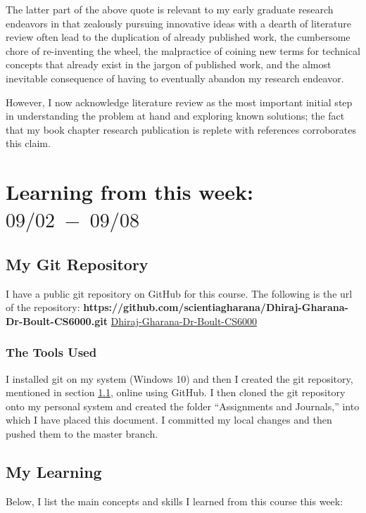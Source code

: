 \documentclass[journal]{IEEEtran}
\begin{document}
\noindent The latter part of the above quote is relevant to my early graduate research endeavors in that zealously pursuing innovative ideas with a dearth of literature review often lead to the duplication of already published work, the cumbersome chore of re-inventing the wheel, the malpractice of coining new terms for technical concepts that already exist in the jargon of published work, and the almost inevitable consequence of having to eventually abandon my research endeavor.  

\noindent However, I now acknowledge literature review as the most important initial step in understanding the problem at hand and exploring known solutions; the fact that my book chapter research publication is replete with references corroborates this claim.  

\section{Learning from this week: {\normalsize $09/02 \; - \; 09/08$ }}
\label{sec:learning}  

\subsection{My Git Repository}  
\label{sec:gitrepo}  
  
\noindent I have a public git repository on GitHub for this course. The following is the url of the repository: {\footnotesize  \textbf{https://github.com/scientiagharana/Dhiraj-Gharana-Dr-Boult-CS6000.git}} \href{https://github.com/scientiagharana/Dhiraj-Gharana-Dr-Boult-CS6000.git}{Dhiraj-Gharana-Dr-Boult-CS6000}  

\subsubsection{The Tools Used}  
\label{sec:toolsused}

\noindent I installed git on my system (Windows 10) and then I created the git repository, mentioned in section \ref{sec:gitrepo}, online using GitHub.  I then cloned the git repository onto my personal system and created the folder ``Assignments and Journals,'' into which I have placed this document. I committed my local changes and then pushed them to the master branch.      

\subsection{My Learning}
Below, I list the main concepts and skills I learned from this course this week:  
\end{document}
